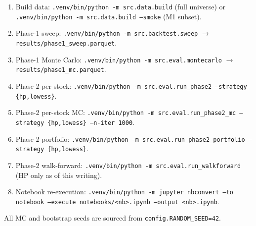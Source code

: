 \documentclass[11pt,a4paper]{article}
\begin{document}
\begin{enumerate}[leftmargin=1.5em,itemsep=2pt]
    \item Build data: \texttt{.venv/bin/python -m src.data.build}
          (full universe) or
          \texttt{.venv/bin/python -m src.data.build --smoke}
          (M1 subset).
    \item Phase-1 sweep:
          \texttt{.venv/bin/python -m src.backtest.sweep}
          $\to$ \texttt{results/phase1\_sweep.parquet}.
    \item Phase-1 Monte Carlo:
          \texttt{.venv/bin/python -m src.eval.montecarlo}
          $\to$ \texttt{results/phase1\_mc.parquet}.
    \item Phase-2 per stock:
          \texttt{.venv/bin/python -m src.eval.run\_phase2
          --strategy \{hp,lowess\}}.
    \item Phase-2 per-stock MC:
          \texttt{.venv/bin/python -m src.eval.run\_phase2\_mc
          --strategy \{hp,lowess\} --n-iter 1000}.
    \item Phase-2 portfolio:
          \texttt{.venv/bin/python -m src.eval.run\_phase2\_portfolio
          --strategy \{hp,lowess\}}.
    \item Phase-2 walk-forward:
          \texttt{.venv/bin/python -m src.eval.run\_walkforward}
          (HP only as of this writing).
    \item Notebook re-execution:
          \texttt{.venv/bin/python -m jupyter nbconvert --to notebook
          --execute notebooks/<nb>.ipynb --output <nb>.ipynb}.
\end{enumerate}

All MC and bootstrap seeds are sourced from \texttt{config.RANDOM\_SEED=42}.

\end{document}
